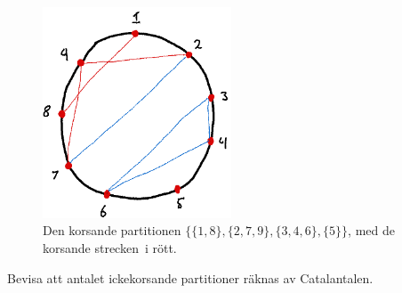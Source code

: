 \documentclass[nobib]{tufte-handout}
\begin{document}
\begin{xca}
    \begin{figure}
        \centering
        \includegraphics[width=0.5\textwidth]{graphics/crossing_partition.png}
        \caption{Den korsande partitionen $\{\{1,8\},\{2,7,9\},\{3,4,6\},\{5\}\}$, med de korsande strecken\, i rött.}
        \label{fig:crossing_partition}
    \end{figure}

    Bevisa att antalet ickekorsande partitioner räknas av Catalantalen.
\end{xca}

\newpage

%
%
\end{document}
